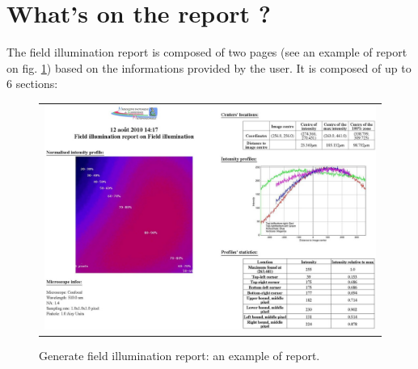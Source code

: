 \documentclass[a4paper, 11pt]{report}%
\begin{document}
\section{What's on the report ?}
\label{sec:gfir-rep}

The field illumination report is composed of two pages (see an example of report on fig. \ref{fig:gfir-report}) based on the informations provided by the user. It is composed of up to 6 sections:
\begin{figure}[!ht]
		\begin{center}
		\begin{tabular}{c}
			\includegraphics[width=\linewidth]{img/gfir-report}
		\end{tabular}
	\end{center}
	\caption{\label{fig:gfir-report}Generate field illumination report: an example of report.}
\end{figure} 
\end{document}

